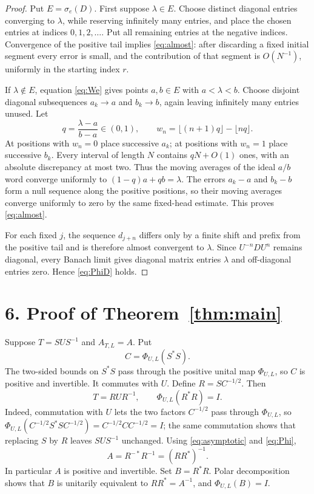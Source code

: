 \documentclass[11pt]{article}
\newcommand{\PhiUL}{\Phi_{U,L}}
\begin{document}
\begin{proof}
Put $E=\sigma_e(D)$.  First suppose $\lambda\in E$.  Choose distinct diagonal entries converging to $\lambda$, while reserving infinitely many entries, and place the chosen entries at indices $0,1,2,\ldots$.  Put all remaining entries at the negative indices.  Convergence of the positive tail implies \eqref{eq:almost}: after discarding a fixed initial segment every error is small, and the contribution of that segment is $O(N^{-1})$, uniformly in the starting index $r$.

If $\lambda\notin E$, equation \eqref{eq:We} gives points $a,b\in E$ with $a<\lambda<b$.  Choose disjoint diagonal subsequences $a_k\to a$ and $b_k\to b$, again leaving infinitely many entries unused.  Let
\[
 q=\frac{\lambda-a}{b-a}\in(0,1),\qquad
 w_n=\lfloor(n+1)q\rfloor-\lfloor nq\rfloor.
\]
At positions with $w_n=0$ place successive $a_k$; at positions with $w_n=1$ place successive $b_k$.  Every interval of length $N$ contains $qN+O(1)$ ones, with an absolute discrepancy at most two.  Thus the moving averages of the ideal $a/b$ word converge uniformly to $(1-q)a+qb=\lambda$.  The errors $a_k-a$ and $b_k-b$ form a null sequence along the positive positions, so their moving averages converge uniformly to zero by the same fixed-head estimate.  This proves \eqref{eq:almost}.

For each fixed $j$, the sequence $d_{j+n}$ differs only by a finite shift and prefix from the positive tail and is therefore almost convergent to $\lambda$.  Since $U^{-n}DU^n$ remains diagonal, every Banach limit gives diagonal matrix entries $\lambda$ and off-diagonal entries zero.  Hence \eqref{eq:PhiD} holds.
\end{proof}

\section*{6. Proof of Theorem~\ref{thm:main}}

Suppose $T=SUS^{-1}$ and $A_{T,L}=A$.  Put
\[
 C=\PhiUL(S^*S).
\]
The two-sided bounds on $S^*S$ pass through the positive unital map $\PhiUL$, so $C$ is positive and invertible.  It commutes with $U$.  Define $R=SC^{-1/2}$.  Then
\[
 T=RUR^{-1},\qquad
 \PhiUL(R^*R)=I.
\]
Indeed, commutation with $U$ lets the two factors $C^{-1/2}$ pass through
$\PhiUL$, so
$\PhiUL(C^{-1/2}S^*SC^{-1/2})=C^{-1/2}CC^{-1/2}=I$; the same
commutation shows that replacing $S$ by $R$ leaves $SUS^{-1}$ unchanged.
Using \eqref{eq:asymptotic} and \eqref{eq:Phi},
\begin{equation}\label{eq:normalizedA}
 A=R^{-*}R^{-1}=(RR^*)^{-1}.
\end{equation}
In particular $A$ is positive and invertible.  Set $B=R^*R$.  Polar decomposition shows that $B$ is unitarily equivalent to $RR^*=A^{-1}$, and $\PhiUL(B)=I$.
\end{document}
